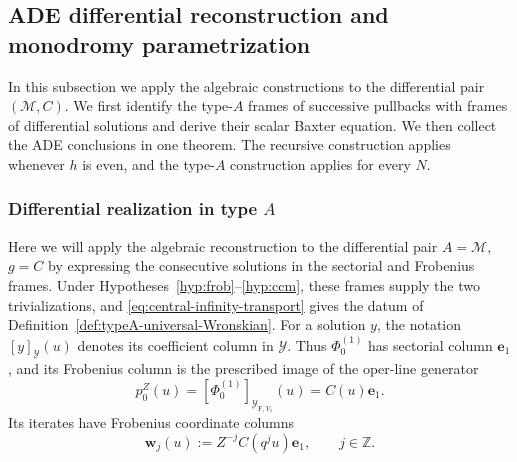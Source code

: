 \documentclass[11pt,leqno]{amsart}
\numberwithin{equation}{section}
\theoremstyle{plain}
\theoremstyle{definition}
\theoremstyle{plain}
\theoremstyle{definition}
\theoremstyle{remark}
\begin{document}
\subsection{ADE differential reconstruction and monodromy parametrization}\label{sec:ADE-differential-reconstruction}\label{sec:finite-shift-realization}
In this subsection we apply the algebraic constructions to the differential pair $(\mathscr M,C)$. We first identify the type-$A$ frames of successive pullbacks with frames of differential solutions and derive their scalar Baxter equation. We then collect the ADE conclusions in one theorem. The recursive construction applies whenever $h$ is even, and the type-$A$ construction applies for every $N$.

\subsubsection{Differential realization in type \texorpdfstring{$A$}{A}}\label{sec:typeA-differential-realization}

Here we will apply the algebraic reconstruction to the differential pair $A=\mathscr M$, $g=C$ by expressing the consecutive solutions in the sectorial and Frobenius frames. Under Hypotheses~\ref{hyp:frob}--\ref{hyp:ccm}, these frames supply the two trivializations, and \eqref{eq:central-infinity-transport} gives the datum of Definition~\ref{def:typeA-universal-Wronskian}. For a solution $y$, the notation $[y]_{\mathcal Y}(u)$ denotes its coefficient column in $\mathcal Y$. Thus $\Phi_0^{(1)}$ has sectorial column $\mathbf e_1$, and its Frobenius column is the prescribed image of the oper-line generator
\begin{equation}\label{eq:typeA-first-coefficient-column}
 p_0^Z(u)=[\Phi_0^{(1)}]_{\mathcal Y_{\mathrm F,V_1}}(u)=C(u)\mathbf e_1.
\end{equation}
Its iterates have Frobenius coordinate columns
\begin{equation}\label{eq:typeA-column}
 \mathbf w_j(u):=Z^{-j}C(q^ju)\mathbf e_1,\qquad j\in\mathbb Z.
\end{equation}
\end{document}

